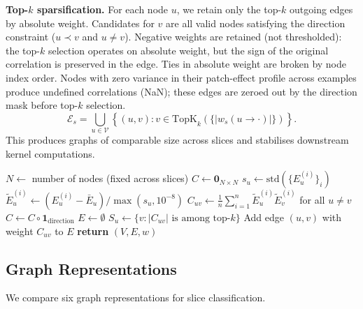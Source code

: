 \documentclass[11pt,a4paper]{article}
\newcommand{\topk}{\mathrm{TopK}}
\newcommand{\node}{\mathcal{V}}
\newcommand{\edge}{\mathcal{E}}
\newcommand{\weight}{w}
\begin{document}
\textbf{Top-$k$ sparsification.} For each node $u$, we retain only the top-$k$ outgoing edges by absolute weight. Candidates for $v$ are all valid nodes satisfying the direction constraint ($u \prec v$ and $u \neq v$). Negative weights are retained (not thresholded): the top-$k$ selection operates on absolute weight, but the sign of the original correlation is preserved in the edge. Ties in absolute weight are broken by node index order. Nodes with zero variance in their patch-effect profile across examples produce undefined correlations (NaN); these edges are zeroed out by the direction mask before top-$k$ selection.
\begin{equation}
\edge_s = \bigcup_{u \in \node} \left\{(u, v) : v \in \topk_k(\{|\weight_s(u \rightarrow \cdot)|\})\right\}.
\end{equation}
This produces graphs of comparable size across slices and stabilises downstream kernel computations.

\begin{algorithm}[t]
\caption{Graph construction from patch effects}
\label{alg:graph_construction}
\begin{algorithmic}[1]
\State $N \gets$ number of nodes (fixed across slices)
\State $C \gets \mathbf{0}_{N \times N}$ 
    \State $s_u \gets \mathrm{std}(\{E_u^{(i)}\}_i)$
    \State $\tilde{E}_u^{(i)} \gets (E_u^{(i)} - \bar{E}_u) / \max(s_u, 10^{-8})$ 
\EndFor
\State $C_{uv} \gets \frac{1}{n}\sum_{i=1}^n \tilde{E}_u^{(i)} \tilde{E}_v^{(i)}$ for all $u \neq v$
\State $C \gets C \circ \mathbf{1}_{\text{direction}}$ 
\State $E \gets \emptyset$
    \State $S_u \gets \{v : |C_{uv}| \text{ is among top-}k\}$
        \State Add edge $(u, v)$ with weight $C_{uv}$ to $E$
    \EndFor
\EndFor
\State \textbf{return} $(V, E, w)$
\end{algorithmic}
\end{algorithm}

\subsection{Graph Representations}

We compare six graph representations for slice classification.
\end{document}
